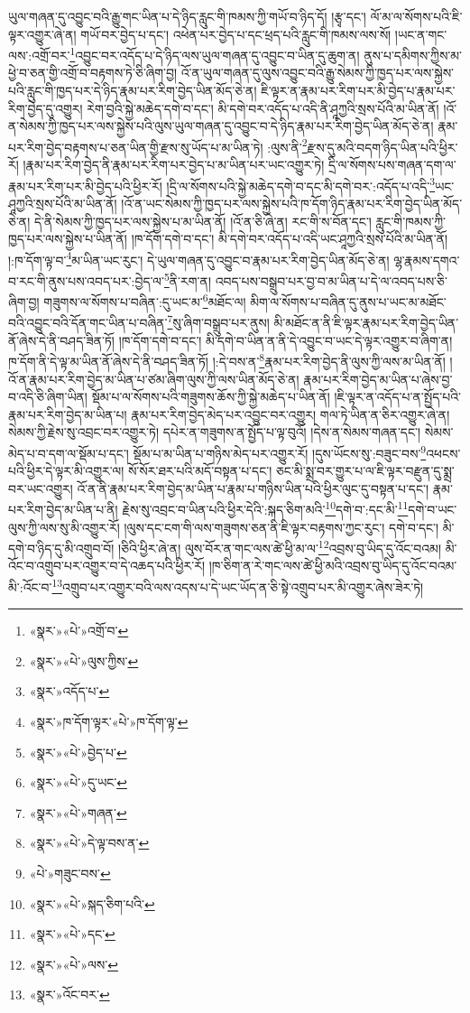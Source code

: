 ཡུལ་གཞན་དུ་འབྱུང་བའི་རྒྱུ་གང་ཡིན་པ་དེ་ཉིད་རླུང་གི་ཁམས་ཀྱི་གཡོ་བ་ཉིད་དོ། །རྩྭ་དང་། ལོ་མ་ལ་སོགས་པའི་ཇི་ལྟར་འགྱུར་ཞེ་ན། གཡོ་བར་བྱེད་པ་དང་། འཕེན་པར་བྱེད་པ་དང་ཕྲད་པའི་རླུང་གི་ཁམས་ལས་སོ། །ཡང་ན་གང་ལས་:འགྲོ་བར་\footnote{«སྣར་»«པེ་»འགྲོ་བ་}འབྱུང་བར་འདོད་པ་དེ་ཉིད་ལས་ཡུལ་གཞན་དུ་འབྱུང་བ་ཡིན་དུ་ཆུག་ན། ནུས་པ་དམིགས་ཀྱིས་མ་ཕྱེ་བ་ཅན་གྱི་འགྲོ་བ་བརྟགས་ཏེ་ཅི་ཞིག་བྱ། འོ་ན་ཡུལ་གཞན་དུ་ལུས་འབྱུང་བའི་རྒྱུ་སེམས་ཀྱི་ཁྱད་པར་ལས་སྐྱེས་པའི་རླུང་གི་ཁྱད་པར་དེ་ཉིད་རྣམ་པར་རིག་བྱེད་ཡིན་མོད་ཅེ་ན། ཇི་ལྟར་ན་རྣམ་པར་རིག་པར་མི་བྱེད་པ་རྣམ་པར་རིག་བྱེད་དུ་འགྱུར། རེག་བྱའི་སྐྱེ་མཆེད་དགེ་བ་དང་། མི་དགེ་བར་འདོད་པ་འདི་ནི་ཤཱཀྱའི་སྲས་པོའི་མ་ཡིན་ནོ། །འོ་ན་སེམས་ཀྱི་ཁྱད་པར་ལས་སྐྱེས་པའི་ལུས་ཡུལ་གཞན་དུ་འབྱུང་བ་དེ་ཉིད་རྣམ་པར་རིག་བྱེད་ཡིན་མོད་ཅེ་ན། རྣམ་པར་རིག་བྱེད་བརྟགས་པ་ཅན་ཡིན་གྱི་རྫས་སུ་ཡོད་པ་མ་ཡིན་ཏེ། :ལུས་ནི་\footnote{«སྣར་»«པེ་»ལུས་ཀྱིས་}རྫས་དུ་མའི་བདག་ཉིད་ཡིན་པའི་ཕྱིར་རོ། །རྣམ་པར་རིག་བྱེད་ནི་རྣམ་པར་རིག་པར་བྱེད་པ་མ་ཡིན་པར་ཡང་འགྱུར་ཏེ། དྲི་ལ་སོགས་པས་གཞན་དག་ལ་རྣམ་པར་རིག་པར་མི་བྱེད་པའི་ཕྱིར་རོ། །དྲི་ལ་སོགས་པའི་སྐྱེ་མཆེད་དགེ་བ་དང་མི་དགེ་བར་:འདོད་པ་འདི་\footnote{«སྣར་»འདོད་པ་}ཡང་ཤཱཀྱའི་སྲས་པོའི་མ་ཡིན་ནོ། །འོ་ན་ཡང་སེམས་ཀྱི་ཁྱད་པར་ལས་སྐྱེས་པའི་ཁ་དོག་ཉིད་རྣམ་པར་རིག་བྱེད་ཡིན་མོད་ཅེ་ན། དེ་ནི་སེམས་ཀྱི་ཁྱད་པར་ལས་སྐྱེས་པ་མ་ཡིན་ནོ། །འོ་ན་ཅི་ཞེ་ན། རང་གི་ས་བོན་དང་། རླུང་གི་ཁམས་ཀྱི་ཁྱད་པར་ལས་སྐྱེས་པ་ཡིན་ནོ། །ཁ་དོག་དགེ་བ་དང་། མི་དགེ་བར་འདོད་པ་འདི་ཡང་ཤཱཀྱའི་སྲས་པོའི་མ་ཡིན་ནོ། །:ཁ་དོག་ལྟ་བ་\footnote{«སྣར་»ཁ་དོག་ལྟར་«པེ་»ཁ་དོག་ལྟ་}མ་ཡིན་ཡང་རུང་། དེ་ཡུལ་གཞན་དུ་འབྱུང་བ་རྣམ་པར་རིག་བྱེད་ཡིན་མོད་ཅེ་ན། ལྷ་རྣམས་དགའ་བ་རང་གི་ནུས་པས་འབད་པར་:བྱེད་ལ་\footnote{«སྣར་»«པེ་»བྱེད་པ་}ནི་རག་ན། འབད་པས་བསྒྲུབ་པར་བྱ་བ་མ་ཡིན་པ་དེ་ལ་འབད་པས་ཅི་ཞིག་བྱ། གཟུགས་ལ་སོགས་པ་བཞིན་:དུ་ཡང་མ་\footnote{«སྣར་»«པེ་»དུ་ཡང་}མཐོང་ལ། མིག་ལ་སོགས་པ་བཞིན་དུ་ནུས་པ་ཡང་མ་མཐོང་བའི་འབྱུང་བའི་དོན་གང་ཡིན་པ་བཞིན་\footnote{«སྣར་»«པེ་»གཞན་}སུ་ཞིག་བསྒྲུབ་པར་ནུས། མི་མཐོང་ན་ནི་ཇི་ལྟར་རྣམ་པར་རིག་བྱེད་ཡིན་ནོ་ཞེས་དེ་ནི་བཤད་ཟིན་ཏོ། །ཁ་དོག་དགེ་བ་དང་། མི་དགེ་བ་ཡིན་ན་ནི་དེ་འབྱུང་བ་ཡང་དེ་ལྟར་འགྱུར་བ་ཞིག་ན། ཁ་དོག་ནི་དེ་ལྟ་མ་ཡིན་ནོ་ཞེས་དེ་ནི་བཤད་ཟིན་ཏོ། །:དེ་བས་ན་\footnote{«སྣར་»«པེ་»དེ་ལྟ་བས་ན་}རྣམ་པར་རིག་བྱེད་ནི་ལུས་ཀྱི་ལས་མ་ཡིན་ནོ། །འོ་ན་རྣམ་པར་རིག་བྱེད་མ་ཡིན་པ་ཙམ་ཞིག་ལུས་ཀྱི་ལས་ཡིན་མོད་ཅེ་ན། རྣམ་པར་རིག་བྱེད་མ་ཡིན་པ་ཞེས་བྱ་བ་འདི་ཅི་ཞིག་ཡིན། སྡོམ་པ་ལ་སོགས་པའི་གཟུགས་ཆོས་ཀྱི་སྐྱེ་མཆེད་པ་ཡིན་ནོ། །ཇི་ལྟར་ན་འདོད་པ་ན་སྤྱོད་པའི་རྣམ་པར་རིག་བྱེད་མ་ཡིན་པ། རྣམ་པར་རིག་བྱེད་མེད་པར་འབྱུང་བར་འགྱུར། གལ་ཏེ་ཡིན་ན་ཅིར་འགྱུར་ཞེ་ན། སེམས་ཀྱི་རྗེས་སུ་འབྲང་བར་འགྱུར་ཏེ། དཔེར་ན་གཟུགས་ན་སྤྱོད་པ་ལྟ་བུའོ། །དེས་ན་སེམས་གཞན་དང་། སེམས་མེད་པ་བ་དག་ལ་སྡོམ་པ་དང་། སྡོམ་པ་མ་ཡིན་པ་གཉིས་མེད་པར་འགྱུར་རོ། །དུས་ཡོངས་སུ་:བཟུང་བས་\footnote{«པེ་»གཟུང་བས་}འཕངས་པའི་ཕྱིར་དེ་ལྟར་མི་འགྱུར་ལ། སོ་སོར་ཐར་པའི་མདོ་བསྟན་པ་དང་། ཅང་མི་སྨྲ་བར་གྱུར་པ་ལ་ཇི་ལྟར་བརྫུན་དུ་སྨྲ་བར་ཡང་འགྱུར། འོ་ན་ནི་རྣམ་པར་རིག་བྱེད་མ་ཡིན་པ་རྣམ་པ་གཉིས་ཡིན་པའི་ཕྱིར་ལུང་དུ་བསྟན་པ་དང་། རྣམ་པར་རིག་བྱེད་མ་ཡིན་པ་ནི། རྗེས་སུ་འབྲང་བ་ཡིན་པའི་ཕྱིར་དེའི་:སྐད་ཅིག་མའི་\footnote{«སྣར་»«པེ་»སྐད་ཅིག་པའི་}དགེ་བ་:དང་མི་\footnote{«སྣར་»«པེ་»དང་}དགེ་བ་ཡང་ལུས་ཀྱི་ལས་སུ་མི་འགྱུར་རོ། །ལུས་དང་ངག་གི་ལས་གཟུགས་ཅན་ནི་ཇི་ལྟར་བརྟགས་ཀྱང་རུང་། དགེ་བ་དང་། མི་དགེ་བ་ཉིད་དུ་མི་འགྲུབ་བོ། །ཅིའི་ཕྱིར་ཞེ་ན། ལུས་བོར་ན་གང་ལས་ཚེ་ཕྱི་མ་ལ་\footnote{«སྣར་»«པེ་»ལས་}འབྲས་བུ་ཡིད་དུ་འོང་བའམ། མི་འོང་བ་འགྲུབ་པར་འགྱུར་བ་དེ་འཆད་པའི་ཕྱིར་རོ། །ཁ་ཅིག་ན་རེ་གང་ལས་ཚེ་ཕྱི་མའི་འབྲས་བུ་ཡིད་དུ་འོང་བའམ་མི་:འོང་བ་\footnote{«སྣར་»འོང་བར་}འགྲུབ་པར་འགྱུར་བའི་ལས་འདས་པ་དེ་ཡང་ཡོད་ན་ཅི་སྟེ་འགྲུབ་པར་མི་འགྱུར་ཞེས་ཟེར་ཏེ། 
